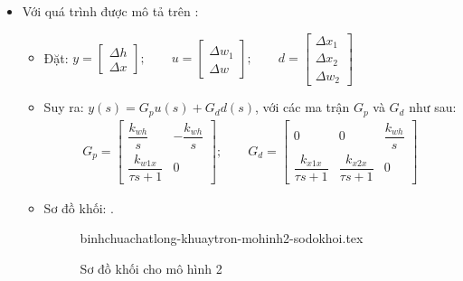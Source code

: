 \begin{itemize}
        \item Với quá trình được mô tả trên \fig{\ref{Fig:binhchuachatlong-khuaytron-mohinh2}}:
            \begin{itemize}
                \item Đặt: $y = \left[\begin{array}{c}\Delta h \\ \Delta x \end{array}\right]; \qquad u = \left[\begin{array}{c}\Delta w_1 \\ \Delta w \end{array}\right]; \qquad d = \left[\begin{array}{c}\Delta x_1 \\ \Delta x_2 \\ \Delta w_2 \end{array}\right]$
                \item Suy ra: $y(s) = G_p u(s) + G_d d(s)$, với các ma trận $G_p$ và $G_d$ như sau:
                    \begin{align*}
                        G_p = \left[\begin{array}{cc}\dfrac{k_{wh}}{s} & -\dfrac{k_{wh}}{s} \\ \dfrac{k_{w1x}}{\tau s + 1} & 0\end{array}\right]; \qquad G_d = \left[\begin{array}{ccc}0 & 0 & \dfrac{k_{wh}}{s} \\ \dfrac{k_{x1x}}{\tau s + 1} & \dfrac{k_{x2x}}{\tau s + 1} & 0 \end{array}\right]
                    \end{align*}
                \item Sơ đồ khối: \fig{\ref{Fig:binhchuachatlong-khuaytron-mohinh2-sodokhoi}}.
                    \begin{figure}[!htp]
                        \begin{center}
                            {binhchuachatlong-khuaytron-mohinh2-sodokhoi.tex}
                        \end{center}
                        \caption{Sơ đồ khối cho mô hình 2} \label{Fig:binhchuachatlong-khuaytron-mohinh2-sodokhoi}
                    \end{figure}
            \end{itemize}
    \end{itemize}

